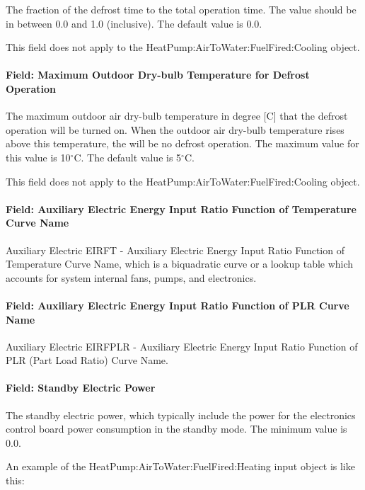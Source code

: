 The fraction of the defrost time to the total operation time. The value should be in between 0.0 and 1.0 (inclusive). The default value is 0.0.

This field does not apply to the HeatPump:AirToWater:FuelFired:Cooling object.

\paragraph{Field: Maximum Outdoor Dry-bulb Temperature for Defrost Operation}

The maximum outdoor air dry-bulb temperature in degree [C] that the defrost operation will be turned on. When the outdoor air dry-bulb temperature rises above this temperature, the will be no defrost operation. The maximum value for this value is 10$^\circ$C. The default value is 5$^\circ$C.

This field does not apply to the HeatPump:AirToWater:FuelFired:Cooling object.

\paragraph{Field: Auxiliary Electric Energy Input Ratio Function of Temperature Curve Name}

Auxiliary Electric EIRFT - Auxiliary Electric Energy Input Ratio Function of Temperature Curve Name, which is a biquadratic curve or a lookup table which accounts for system internal fans, pumps, and electronics.

\paragraph{Field: Auxiliary Electric Energy Input Ratio Function of PLR Curve Name}

Auxiliary Electric EIRFPLR - Auxiliary Electric Energy Input Ratio Function of PLR (Part Load Ratio) Curve Name.

\paragraph{Field: Standby Electric Power}

The standby electric power, which typically include the power for the electronics control board power consumption in the standby mode. The minimum value is 0.0.

An example of the HeatPump:AirToWater:FuelFired:Heating input object is like this:

